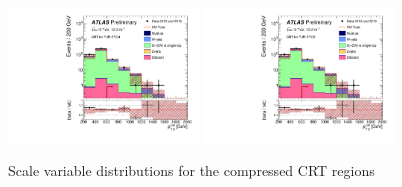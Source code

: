 \begin{figure}[tbp]
\begin{center}
\includegraphics[width=0.45\textwidth]{figures/ATLAS-CONF-2016-078_INT/N-1Plots/AtlasStyle/Preliminary/CRT_SRJigsawSRC4_LastCut_CRT_minusone}
\includegraphics[width=0.45\textwidth]{figures/ATLAS-CONF-2016-078_INT/N-1Plots/AtlasStyle/Preliminary/CRT_SRJigsawSRC5_LastCut_CRT_minusone}
\end{center}
\caption{Scale variable distributions for the compressed CRT regions}
\label{fig:CRT_SRJigsawSRC1_LastCut_CRT_minusone}
\end{figure}

